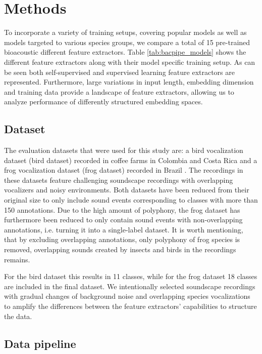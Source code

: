 \section{Methods}
\label{sec:methods}

To incorporate a variety of training setups, covering popular models as well as models targeted to various species groups, we compare a total of 15 pre-trained bioacoustic different feature extractors.
Table \ref{tab:bacpipe_models} shows the different feature extractors along with their model specific training setup. 
As can be seen both self-supervised and supervised learning feature extractors are represented. 
Furthermore, large variations in input length, embedding dimension and training data provide a landscape of feature extractors, allowing us to analyze performance of differently structured embedding spaces.

\subsection{Dataset}
\label{ssub:dataset}

The evaluation datasets that were used for this study are: a bird vocalization dataset (bird dataset) recorded in coffee farms in Colombia and Costa Rica \cite{vega-hidalgo_collection_2023} and a frog vocalization dataset (frog dataset) recorded in Brazil \cite{canas_dataset_2023}.
The recordings in these datasets feature challenging soundscape recordings with overlapping vocalizers and noisy environments.
Both datasets have been reduced from their original size to only include sound events corresponding to classes with more than 150 annotations.
Due to the high amount of polyphony, the frog dataset has furthermore been reduced to only contain sound events with non-overlapping annotations, i.e. turning it into a single-label dataset.
It is worth mentioning, that by excluding overlapping annotations, only polyphony of frog species is removed, overlapping sounds created by insects and birds in the recordings remains.

For the bird dataset this results in 11 classes, while for the frog dataset 18 classes are included in the final dataset.
We intentionally selected soundscape recordings with gradual changes of background noise and overlapping species vocalizations to amplify the differences between the feature extractors' capabilities to structure the data.





\subsection{Data pipeline}
\label{ssub:data_pipe}

